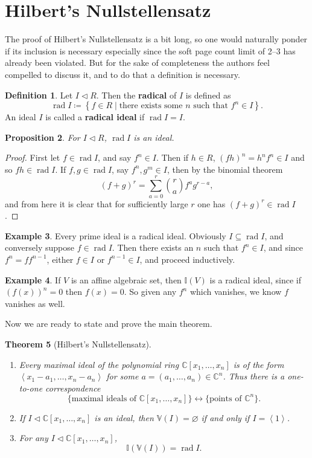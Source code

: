 \documentclass[letterpaper]{article}
\newtheorem{theorem}{Theorem}[section]
\newtheorem{proposition}[theorem]{Proposition}
\theoremstyle{definition}
\newtheorem{definition}[theorem]{Definition}
\newtheorem{example}[theorem]{Example}
\theoremstyle{remark}
\newcommand\CC{\mathbb{C}}
\newcommand\VV{\mathbb{V}}
\newcommand\II{\mathbb{I}}
\newcommand{\defeq}{\coloneqq}
\newcommand{\ideal}{\vartriangleleft}
\newcommand{\brackets}[1]{\left[#1\right]}
\newcommand{\setbraces}[1]{\left\{#1\right\}}
\newcommand{\abrackets}[1]{\left\langle#1\right\rangle}
\DeclareMathOperator{\rad}{rad}
\begin{document}
\section{Hilbert's Nullstellensatz}
The proof of Hilbert's Nullstellensatz is a bit long, so one would naturally ponder if its inclusion is necessary especially since the soft page count limit of 2--3 has already been violated. But for the sake of completeness the authors feel compelled to discuss it, and to do that a definition is necessary. \begin{definition}
    Let $I\ideal R$. Then the \textbf{radical} of $I$ is defined as \[\rad I\defeq \setbraces{f\in R\mid \text{there exists some }n\text{ such that } f^n\in I}.\] An ideal $I$ is called a \textbf{radical ideal} if $\rad I = I$. 
\end{definition}
\begin{proposition}
    For $I\ideal R$, $\rad I$ is an ideal.
\end{proposition} \begin{proof} First let $f\in\rad I$, and say $f^n\in I$. Then if $h\in R$, $(fh)^n=h^nf^n\in I$ and so $fh\in \rad I$. If $f,g\in \rad I$, say $f^n,g^m\in I$, then by the binomial theorem \[(f+g)^r=\sum_{a=0}^r \binom{r}{a}f^ag^{r-a},\] and from here it is clear that for sufficiently large $r$ one has $(f+g)^r\in \rad I$. 
\end{proof} \begin{example}
    Every prime ideal is a radical ideal. Obviously $I\subseteq \rad I$, and conversely suppose $f\in \rad I$. Then there exists an $n$ such that $f^n\in I$, and since $f^n=ff^{n-1}$, either $f\in I$ or $f^{n-1}\in I$, and proceed inductively. 
\end{example}
\begin{example}\label{ex:I-is-radical}
	If \(V\) is an affine algebraic set, then \(\II(V)\) is a radical ideal, since if \((f(x))^n=0\) then \(f(x)=0\). So given any \(f^n\) which vanishes, we know \(f\) vanishes as well. 
\end{example}
Now we are ready to state and prove the main theorem. \begin{theorem}[Hilbert's Nullstellensatz]\label{Nullstellensatz} $~$
    \begin{enumerate}[label=(\roman*)]
        \item Every maximal ideal of the polynomial ring $\CC\brackets{x_1,\dots,x_n}$ is of the form $\abrackets{x_1-a_1,\dots, x_n-a_n}$ for some $a=(a_1,\dots,a_n)\in\CC^n$. Thus there is a one-to-one correspondence \[\{\text{maximal ideals of }\CC[x_1,\dots,x_n] \}\longleftrightarrow \{\text{points of }\CC^n\}.\]

        \item If $I\ideal \CC[x_1,\dots,x_n]$ is an ideal, then $\VV(I)=\varnothing$ if and only if $I=\abrackets{1}$. 
        \item For any $I\ideal \CC[x_1,\dots,x_n]$, \[\II(\VV(I))=\rad I.\]
    \end{enumerate}
\end{theorem}
\end{document}
